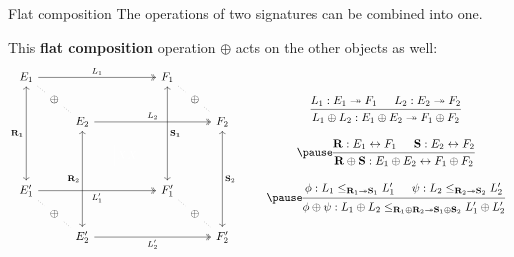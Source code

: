 \documentclass[aspectratio=1610,mathserif]{beamer}
\begin{document}
\begin{frame}[fragile]{Flat composition}
  The operations of two signatures can be combined into one.

  \pause
  This \textbf{flat composition} operation $\oplus$ acts
  on the other objects as well:
  \pause
  \[
    \begin{tikzcd}[sep=tiny]
      E_1 \ar[rrrrrr, twoheadrightarrow, "L_1"]
          \ar[dddddd, leftrightarrow, "\mathbf{R_1}"']
          \ar[rd, dotted, dash] & & &&&&
      F_1 \ar[dddddd, leftrightarrow, "\mathbf{S_1}"]
          \ar[rd, dotted, dash]  & & \\
      & \oplus \ar[rd, dotted, dash] & &&&&
      & \oplus \ar[rd, dotted, dash] & \\
      & & E_2 \ar[rrrrrr, twoheadrightarrow, "L_2"]
              \ar[dddddd, leftrightarrow, "\mathbf{R}_2"'] &&&&
      & & F_2 \ar[dddddd, leftrightarrow, "\mathbf{S}_2"] \\
      \\ &&&& \color{white} \Big| XX \\ \\
      E_1' \ar[rrrrrr, twoheadrightarrow, "L_1'"']
           \ar[rd, dotted, dash] & & &&&&
      F_1' \ar[rd, dotted, dash] & & \\
      & \oplus \ar[rd, dotted, dash] & &&&&
      & \oplus \ar[rd, dotted, dash] & \\
      & & E_2' \ar[rrrrrr, twoheadrightarrow, "L_2'"'] &&&&
      & & F_2'
    \end{tikzcd}
    \qquad
    \begin{array}{c}
    \begin{prooftree}
      \hypo{L_1 : E_1 \twoheadrightarrow F_1}
      \hypo{L_2 : E_2 \twoheadrightarrow F_2}
      \infer2{
        L_1 \oplus L_2 : E_1 \oplus E_2 \twoheadrightarrow F_1 \oplus F_2}
    \end{prooftree}
    \\[2em] \pause
    \begin{prooftree}
      \hypo{\mathbf{R} : E_1 \leftrightarrow F_1}
      \hypo{\mathbf{S} : E_2 \leftrightarrow F_2}
      \infer2{
        \mathbf{R} \oplus \mathbf{S} : E_1 \oplus E_2 \leftrightarrow F_1 \oplus F_2
      }
    \end{prooftree}
    \\[2em] \pause
    \begin{prooftree}
      \hypo{\phi: L_1 \le_{\mathbf{R}_1 \twoheadrightarrow \mathbf{S}_1} L_1'}
      \hypo{\psi: L_2 \le_{\mathbf{R}_2 \twoheadrightarrow \mathbf{S}_2} L_2'}
      \infer2{\phi \oplus \psi :
	L_1 \oplus L_2
        \le_{\mathbf{R}_1 \oplus \mathbf{R}_2 \twoheadrightarrow
             \mathbf{S}_1 \oplus \mathbf{S}_2}
	L_1' \oplus L_2'}
    \end{prooftree}
    \end{array}
  \]
\end{frame}
\end{document}
